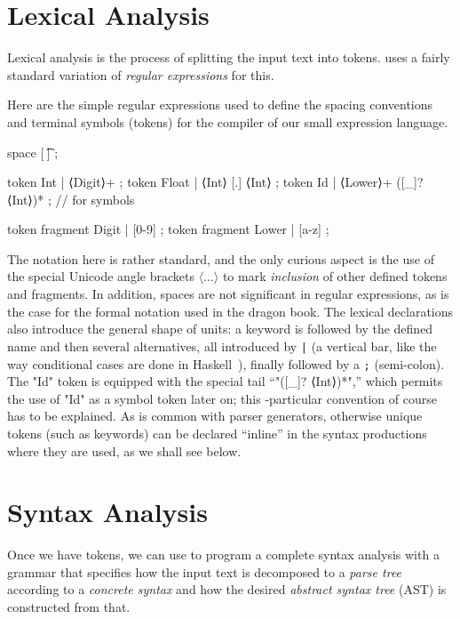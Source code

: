 \documentclass{article}
\begin{document}
\section{Lexical Analysis}
\label{sec:lex}

Lexical analysis is the process of splitting the input text into tokens.  \HAX uses a fairly
standard variation of \emph{regular expressions} for this.

\begin{example}
  Here are the simple regular expressions used to define the spacing conventions and terminal
  symbols (tokens) for the compiler of our small expression language.
\begin{hacs}[xleftmargin=\parindent,texcl]
space [ \t\n] ;

token Int    | ⟨Digit⟩+ ;
token Float  | ⟨Int⟩ [.] ⟨Int⟩ ;
token Id     | ⟨Lower⟩+ ([_]? ⟨Int⟩)* ;  // for symbols

token fragment Digit  | [0-9] ;
token fragment Lower  | [a-z] ;
\end{hacs}
\end{example}

The notation here is rather standard, and the only curious aspect is the use of the special Unicode
angle brackets $⟨…⟩$ to mark \emph{inclusion} of other defined tokens and fragments.  In addition,
spaces are not significant in regular expressions, as is the case for the formal notation used in
the dragon book.
The lexical declarations also introduce the general shape of \HAX units: a keyword is followed by
the defined name and then several alternatives, all introduced by \texttt{|} (a vertical bar, like
the way conditional cases are done in Haskell~\cite{Marlow:haskell2010}), finally followed by a
\texttt{;} (semi-colon).
The "Id" token is equipped with the special tail ``"([_]? ⟨Int⟩)*",'' which permits the use of "Id"
as a symbol token later on; this \HAX-particular convention of course has to be explained.
As is common with parser generators, otherwise unique tokens (such as keywords) can be declared
``inline'' in the syntax productions where they are used, as we shall see below.


\section{Syntax Analysis}
\label{sec:syntax}

Once we have tokens, we can use \HAX to program a complete syntax analysis with a grammar that
specifies how the input text is decomposed to a \emph{parse tree} according to a \emph{concrete
  syntax} and how the desired \emph{abstract syntax tree} (AST) is constructed from that.
\end{document}
